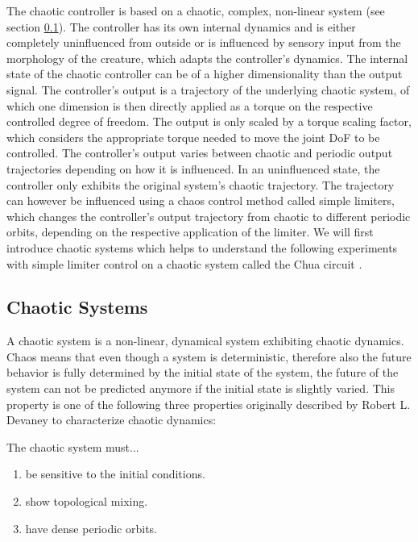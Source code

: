 \documentclass[main]{subfiles}
\begin{document}
The chaotic controller is based on a chaotic, complex, non-linear system (see section \ref{subsec:chaotic-systems}). %
%
The controller has its own internal dynamics and is either completely uninfluenced from outside or is influenced by sensory input from the morphology of the creature, which adapts the controller's dynamics. %
%
The internal state of the chaotic controller can be of a higher dimensionality than the output signal. %
%
The controller's output is a trajectory of the underlying chaotic system, of which one dimension is then directly applied as a torque on the respective controlled degree of freedom. %
%
The output is only scaled by a torque scaling factor, which considers the appropriate torque needed to move the joint DoF to be controlled. %
%
The controller's output varies between chaotic and periodic output trajectories depending on how it is influenced. %
%
In an uninfluenced state, the controller only exhibits the original system's chaotic trajectory. %
%
The trajectory can however be influenced using a chaos control method called simple limiters, which changes the controller's output trajectory from chaotic to different periodic orbits, depending on the respective application of the limiter. %
%
We will first introduce chaotic systems which helps to understand the following experiments with simple limiter control on a chaotic system called the Chua circuit \cite{bib:Matsumoto1985}.

\subsection{Chaotic Systems}
\label{subsec:chaotic-systems}

A chaotic system is a non-linear, dynamical system exhibiting chaotic dynamics. %
%
Chaos means that even though a system is deterministic, therefore also the future behavior is fully determined by the initial state of the system, the future of the system can not be predicted anymore if the initial state is slightly varied. %
%
This property is one of the following three properties originally described by Robert L. Devaney \cite{bib:Devaney1989} to characterize chaotic dynamics:

The chaotic system must...
\begin{enumerate}
\item be sensitive to the initial conditions.
\item show topological mixing.
\item have dense periodic orbits.
\end{enumerate}
\end{document}
